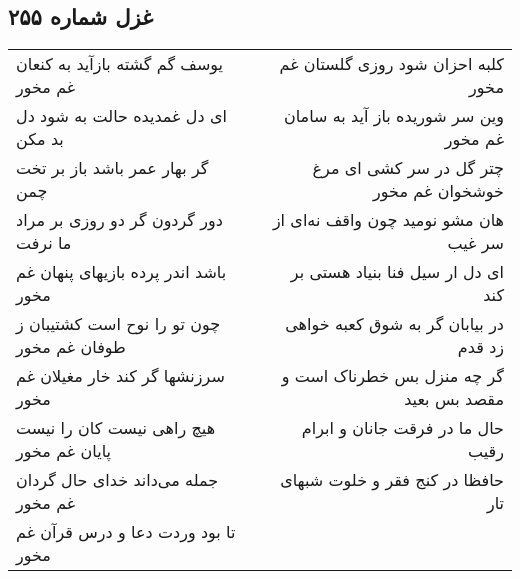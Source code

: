 \begin{center}
\section*{غزل شماره ۲۵۵}
\label{sec:sh255}
\begin{longtable}{l p{0.5cm} r}
یوسف گم گشته بازآید به کنعان غم مخور
&&
کلبه احزان شود روزی گلستان غم مخور
\\
ای دل غمدیده حالت به شود دل بد مکن
&&
وین سر شوریده باز آید به سامان غم مخور
\\
گر بهار عمر باشد باز بر تخت چمن
&&
چتر گل در سر کشی ای مرغ خوشخوان غم مخور
\\
دور گردون گر دو روزی بر مراد ما نرفت 
&&
هان مشو نومید چون واقف نه‌ای از سر غیب
\\
باشد اندر پرده بازیهای پنهان غم مخور
&&
ای دل ار سیل فنا بنیاد هستی بر کند
\\
چون تو را نوح است کشتیبان ز طوفان غم مخور
&&
در بیابان گر به شوق کعبه خواهی زد قدم
\\
سرزنشها گر کند خار مغیلان غم مخور
&&
گر چه منزل بس خطرناک است و مقصد بس بعید
\\
هیچ راهی نیست کان را نیست پایان غم مخور
&&
حال ما در فرقت جانان و ابرام رقیب
\\
جمله می‌داند خدای حال گردان غم مخور
&&
حافظا در کنج فقر و خلوت شبهای تار
\\
تا بود وردت دعا و درس قرآن غم مخور
&&
\end{longtable}
\end{center}
